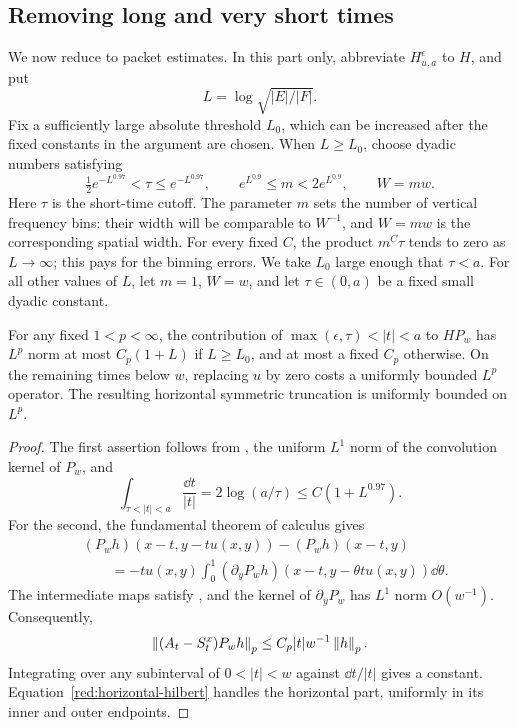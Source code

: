 \subsection{Removing long and very short times}

We now reduce  to packet estimates. In this
part only, abbreviate \(H_{u,a}^{\epsilon}\) to \(H\), and put
\[
 L=\log\sqrt{|E|/|F|}.
\]
Fix a sufficiently large absolute threshold \(L_0\), which can be
increased after the fixed constants in the argument are chosen.
When \(L\ge L_0\), choose dyadic numbers satisfying
\begin{equation}\label{red:small-time-parameters}
 \tfrac12 e^{-L^{0.97}}<\tau\le e^{-L^{0.97}},\qquad
 e^{L^{0.9}}\le m<2e^{L^{0.9}},\qquad W=mw.
\end{equation}
Here \(\tau\) is the short-time cutoff. The parameter \(m\)
sets the number of vertical frequency bins: their width will be
comparable to \(W^{-1}\), and \(W=mw\) is the corresponding
spatial width. For every fixed \(C\), the product \(m^C\tau\)
tends to zero as \(L\to\infty\); this pays for the binning errors.
We take \(L_0\) large enough that \(\tau<a\).
For all other values of \(L\), let \(m=1\), \(W=w\), and let
\(\tau\in(0,a)\) be a fixed small dyadic constant.

\begin{lemma}\label{red:time-reduction}
For any fixed \(1<p<\infty\), the contribution of
\(\max(\epsilon,\tau)<|t|<a\) to \(HP_w\) has \(L^p\) norm
at most \(C_p(1+L)\) if \(L\ge L_0\), and at most a fixed
\(C_p\) otherwise. On the remaining times below \(w\), replacing
\(u\) by zero costs a uniformly bounded \(L^p\) operator. The
resulting horizontal symmetric truncation is uniformly bounded on
\(L^p\).
\end{lemma}

\begin{proof}
The first assertion follows from , the uniform
\(L^1\) norm of the convolution kernel of \(P_w\), and
\[
 \int_{\tau<|t|<a}\frac{\dd t}{|t|}
       =2\log(a/\tau)\le C(1+L^{0.97}).
\]
For the second, the fundamental theorem of calculus gives
\[
 \begin{split}
 &(P_wh)(x-t,y-tu(x,y))-(P_wh)(x-t,y)\\
 &\qquad=-t u(x,y)\int_0^1
    (\partial_yP_wh)(x-t,y-\theta t u(x,y))\dd\theta.
 \end{split}
\]
The intermediate maps satisfy , and the kernel
of \(\partial_yP_w\) has \(L^1\) norm \(O(w^{-1})\).
Consequently,
\begin{equation}\label{red:short-time-error}
 \left\|(A_t-S_t^x)P_wh\right\|_p
        \le C_p |t|w^{-1}\left\|h\right\|_p.
\end{equation}
Integrating over any subinterval of \(0<|t|<w\) against
\(\dd t/|t|\) gives a constant. Equation~\eqref{red:horizontal-hilbert}
handles the horizontal part, uniformly in its inner and outer
endpoints.
\end{proof}

